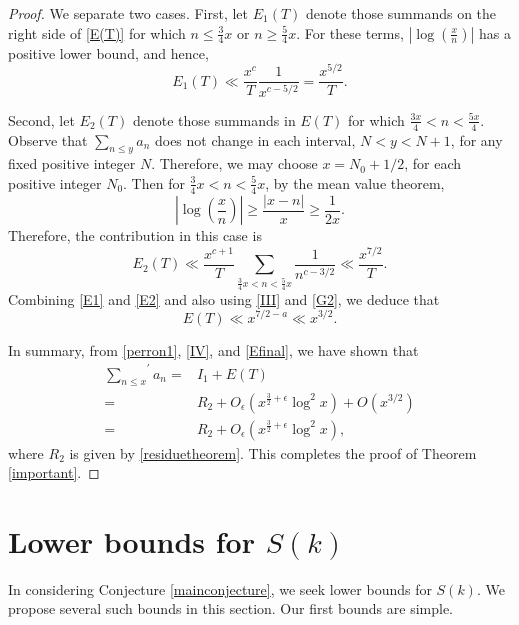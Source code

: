 \documentclass[11pt,reqno]{amsart}
\newcommand{\df}{\dfrac}
\theoremstyle{plain}
\numberwithin{equation}{section}
\begin{document}
\begin{proof}
 We separate two cases.  First, let $E_1(T)$ denote those summands on the right side of \eqref{E(T)}  for which  $n \leq \frac{3}{4} x$ or $n\geq \frac{5}{4} x$. For these terms,  $|\log(\frac{x}{n})|$ has a positive lower bound, and hence,
  \begin{equation}\label{E1}
 E_1(T) \ll \frac{x^c}{T}\df{1}{x^{c-5/2}}=\df{x^{5/2}}{T}.
 \end{equation}


  Second, let $E_2(T)$ denote those summands in $E(T)$ for which $\frac{3x}{4}<n<\frac{5x}{4}.$
 Observe that  $\sum_{n\leq y}a_n $
 does not change in each interval, $N < y < N + 1$, for any fixed positive
integer $N$. Therefore, we may choose $x = N_0 + 1/2$, for each positive integer $N_0$. Then for
 $\frac{3}{4}x <n<\frac{5}{4} x$, by the mean value theorem,
\begin{equation*}\label{EE}
\left|\log \left(\frac{x}{n}\right)\right|\geq \frac{|x-n|}{x}\geq \frac{1}{2x}.
\end{equation*}
Therefore, the contribution in this case is
\begin{equation}\label{E2}
E_2(T)\ll \frac{x^{c+1} }{T} \sum_{\frac{3}{4}x <n<\frac{5}{4} x}\frac{1}{n^{c-3/2}}\ll \frac{x^{7/2} }{T}.
\end{equation}
 Combining \eqref{E1} and \eqref{E2} and also using \eqref{III} and \eqref{G2},  we deduce that
 \begin{equation}\label{Efinal}
 E(T)\ll x^{7/2-a}\ll x^{3/2}.
 \end{equation}


 In summary, from \eqref{perron1}, \eqref{IV}, and \eqref{Efinal}, we have shown that
 \begin{align*}
 {\sum_{n\leq x}}^{\prime}a_n=&I_1+E(T)\\
 =&R_2+ O_\epsilon(x^{\frac{3}{2}+{\epsilon}}\log^2x)+O(x^{3/2})\\
 =&R_2+ O_\epsilon(x^{\frac{3}{2}+{\epsilon}}\log^2x),
 \end{align*}
 where $R_2$ is given by \eqref{residuetheorem}.  This completes the proof of Theorem \ref{important}.
  \end{proof}


\section{Lower bounds for  $S(k)$}\label{lowerbounds}

In considering Conjecture \ref{mainconjecture}, we seek lower bounds for  $S(k)$.  We propose several such bounds in this section. Our first bounds are simple.
\end{document}
